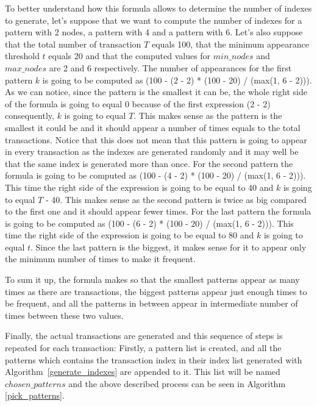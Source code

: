 \documentclass{acm_proc_article-sp-sigmod09}
\begin{document}
To better understand how this formula allows to determine the number of indexes to generate, let's suppose that we want to compute the number of indexes for a pattern with 2 nodes, a pattern with 4 and a pattern with 6. Let's also suppose that the total number of transaction $T$ equals 100, that the minimum appearance threshold $t$ equals 20 and that the computed values for $min\_nodes$ and $max\_nodes$ are 2 and 6 respectively. The number of appearances for the first pattern $k$ is going to be computed as (100 - (2 - 2) * (100 - 20) / (max(1, 6 - 2))). As we can notice, since the pattern is the smallest it can be, the whole right side of the formula is going to equal 0 because of the first expression (2 - 2) consequently, $k$ is going to equal $T$. This makes sense as the pattern is the smallest it could be and it should appear a number of times equals to the total transactions. Notice that this does not mean that this pattern is going to appear in every transaction as the indexes are generated randomly and it may well be that the same index is generated more than once. For the second pattern the formula is going to be computed as (100 - (4 - 2) * (100 - 20) / (max(1, 6 - 2))). This time the right side of the expression is going to be equal to 40 and $k$ is going to equal $T$ - 40. This makes sense as the second pattern is twice as big compared to the first one and it should appear fewer times. For the last pattern the formula is going to be computed as (100 - (6 - 2) * (100 - 20) / (max(1, 6 - 2))). This time the right side of the expression is going to be equal to 80 and $k$ is going to equal $t$. Since the last pattern is the biggest, it makes sense for it to appear only the minimum number of times to make it frequent.

To sum it up, the formula makes so that the smallest patterns appear as many times as there are transactions, the biggest patterns appear just enough times to be frequent, and all the patterns in between appear in intermediate number of times between these two values.

Finally, the actual transactions are generated and this sequence of steps is repeated for each transaction: Firstly, a pattern list is created, and all the patterns which contains the transaction index in their index list generated with Algorithm~\ref{generate_indexes} are appended to it. This list will be named $chosen\_patterns$ and the above described process can be seen in Algorithm \ref{pick_patterns}.
\end{document}
